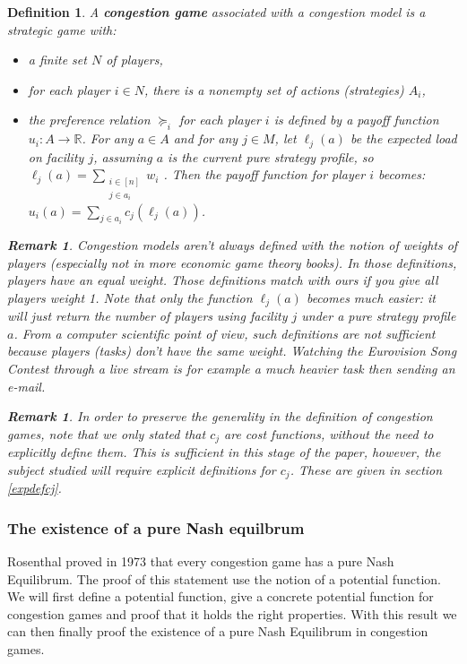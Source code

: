 \documentclass[a4paper,11pt]{article}
\newtheorem{definition}[theorem]{Definition}
\newtheorem{remark}[theorem]{Remark}
\newcommand{\R}{{\mathbb R}}
\begin{document}
\begin{definition}\cite{2,4}
A \textbf{congestion game} associated with a congestion model is a strategic game with:
\begin{itemize}
  \item a finite set $N$ of players,
  \item for each player $i \in N$, there is a nonempty set of actions (strategies) $A_i$,
  \item the preference relation $\succeq_i$ for each player $i$ is defined by a payoff function $u_i: A \rightarrow \R$. For any $a \in A$ and for any $j \in M$, let $\ell_j(a)$ be \emph{the expected load on facility} $j$, assuming $a$ is the current pure strategy profile, so $\ell_j(a) = \sum_{\substack{i \in [n]\\j \in a_i}}{w_i}$ . Then the payoff function for player $i$ becomes: $u_i(a) = \sum_{j\in a_i} c_j(\ell_j(a))$.


\end{itemize}
\begin{remark}
Congestion models aren't always defined with the notion of weights of players (especially not in more economic game theory books). In those definitions, players have an equal weight. Those definitions match with ours if you give all players weight 1. Note that only the function $\ell_j(a)$ becomes much easier: it will just return the number of players using facility $j$ under a pure strategy profile $a$. From a computer scientific point of view, such definitions are not sufficient because players (\emph{tasks}) don't have the same weight. Watching the Eurovision Song Contest through a live stream is for example a much heavier task then sending an e-mail.
\end{remark}
\begin{remark}\label{defcj}
In order to preserve the generality in the definition of congestion games, note that we only stated that $c_j$ are cost functions, without the need to explicitly define them. This is sufficient in this stage of the paper, however, the subject studied will require explicit definitions for $c_j$. These are given in section \ref{expdefcj}.
\end{remark}
\end{definition}
\subsubsection{The existence of a pure Nash equilbrum}
Rosenthal proved in 1973 that every congestion game has a pure Nash Equilibrum. The proof of this statement use the notion of a potential function. We will first define a potential function, give a concrete potential function for congestion games and proof that it holds the right properties. With this result we can then finally proof the existence of a pure Nash Equilibrum in congestion games.
\end{document}
